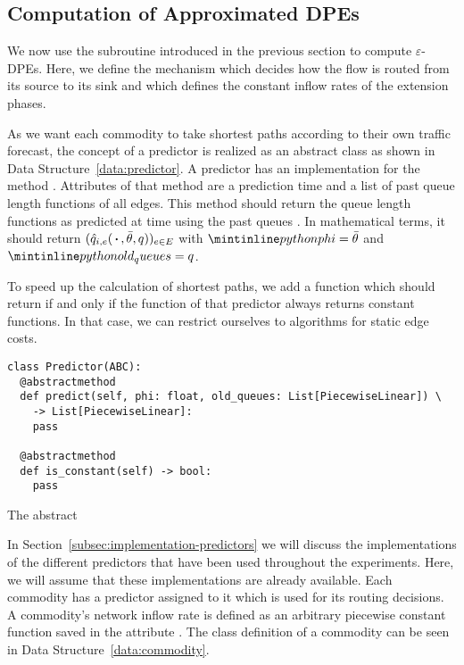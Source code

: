 \clearpage

\subsection{Computation of Approximated DPEs}\label{subsec:compute-dpes}

We now use the subroutine introduced in the previous section to compute $\varepsilon$-DPEs.
Here, we define the mechanism which decides how the flow is routed from its source to its sink and which defines the constant inflow rates of the extension phases.

As we want each commodity to take shortest paths according to their own traffic forecast, the concept of a predictor is realized as an abstract class as shown in Data Structure~\ref{data:predictor}.
A predictor has an implementation for the method . Attributes of that method are a prediction time  and a list  of past queue length functions of all edges.
This method should return the queue length functions as predicted at time  using the past queues .
In mathematical terms, it should return $(\hat q_{i,e}(\,\boldsymbol{\cdot}\,, \bar\theta, q))_{e\in E}$ with $\code{phi}= \bar\theta$ and $\code{old_queues} = q$.

To speed up the calculation of shortest paths, we add a function  which should return  if and only if the  function of that predictor always returns constant functions.
In that case, we can restrict ourselves to algorithms for static edge costs.

\begin{classdef}
  \begin{verbatim}
class Predictor(ABC):
  @abstractmethod
  def predict(self, phi: float, old_queues: List[PiecewiseLinear]) \
    -> List[PiecewiseLinear]:
    pass
  
  @abstractmethod
  def is_constant(self) -> bool:
    pass
\end{verbatim}
\caption{The abstract }
\label{data:predictor}
\end{classdef}


In Section~\ref{subsec:implementation-predictors} we will discuss the implementations of the different predictors that have been used throughout the experiments.
Here, we will assume that these implementations are already available.
Each commodity has a predictor assigned to it which is used for its routing decisions.
A commodity's network inflow rate is defined as an arbitrary piecewise constant function saved in the attribute . 
The class definition of a commodity can be seen in Data Structure~\ref{data:commodity}.

